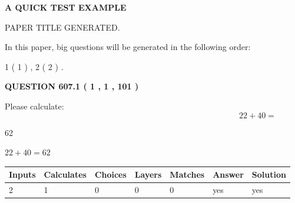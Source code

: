 \documentclass[12pt]{article}
\begin{document}
   
 \vspace{0.2in}
{\LARGE {\textbf{ A QUICK TEST EXAMPLE}}}
   
   
 PAPER TITLE GENERATED.
   
   
   
\vspace{0.2in}
   
In this paper, big questions will be generated in the following order: 
   
   
   1 ( 1 )
 ,
   2 ( 2 )
 .
  
\vspace{0.2in}
  
{\textbf{\Large{QUESTION
607.1 
 ( 1 , 1 , 101 )
}}}
  
  
 
Please calculate:
\begin{equation}
22 +  %
40 = \nonumber
\end{equation}
 
 
 
\noindent{}
 
 

62
 
 
\noindent{}
 
 

 
 
 
\noindent{}
 
 

$ %
22 +  %
40=   %
62$
 
 
\noindent{}
 
 

 
   
   
   
   
\noindent\begin{tabular}{|l|l|l|l|l|l|l|}
 \hline
Inputs & Calculates & Choices & Layers & Matches & Answer & Solution \\ \hline
 2  & 
 1  & 
 0
  & 
 0  & 
 0  & 
  yes & 
  yes 
  \\ \hline
 \end{tabular}
   
   
   
   
\noindent{}
   
\end{document}
